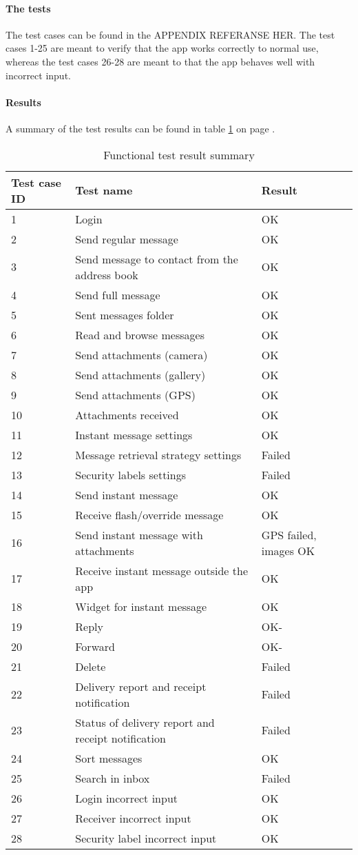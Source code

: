 			\paragraph{The tests}
				The test cases can be found in the APPENDIX REFERANSE HER.
				The test cases 1-25 are meant to verify that the app works correctly to normal use, whereas the test cases 26-28 are meant to that the app behaves well with incorrect input.
			\paragraph{Results}
				A summary of the test results can be found in table \ref{tab:caseresults} on page \pageref{tab:caseresults}.
				\begin{table}
					\begin{tabular}{l|l|l}\hline
						Test case ID &Test name&Result \\ \hline
						1&Login&OK\\
						2&Send regular message&OK\\
						3&Send message to contact from the address book&OK\\
						4&Send full message&OK\\
						5&Sent messages folder&OK\\
						6&Read and browse messages&OK\\
						7&Send attachments (camera)&OK\\
						8&Send attachments (gallery)&OK\\
						9&Send attachments (GPS)&OK\\
						10&Attachments received&OK\\
						11&Instant message settings&OK\\
						12&Message retrieval strategy settings&Failed\\
						13&Security labels settings&Failed\\
						14&Send instant message&OK\\
						15&Receive flash/override message&OK\\
						16&Send instant message with attachments&GPS failed, images OK\\
						17&Receive instant message outside the app&OK\\
						18&Widget for instant message&OK\\
						19&Reply&OK-\\
						20&Forward&OK-\\
						21&Delete&Failed\\
						22&Delivery report and receipt notification&Failed\\
						23&Status of delivery report and receipt notification&Failed\\
						24&Sort messages&OK\\
						25&Search in inbox&Failed\\	
						26&Login incorrect input&OK\\
						27&Receiver incorrect input&OK\\
						28&Security label incorrect input&OK\\ \hline
					\end{tabular}
				\caption{Functional test result summary} \label{tab:caseresults}
			\end{table}
